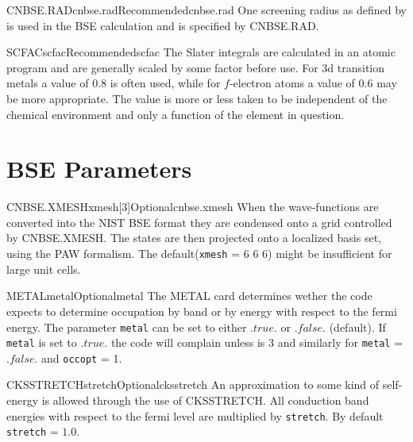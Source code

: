 \documentclass[11pt]{report}
\begin{document}
\begin{Card}{CNBSE.RAD}{cnbse.rad}{Recommended}{cnbse.rad}
One screening radius as defined by  is used in the BSE calculation and is specified by CNBSE.RAD. 
\end{Card}

\begin{Card}{SCFAC}{scfac}{Recommended}{scfac}
The Slater integrals are calculated in an atomic program and are generally scaled by some factor before use. For 3d transition metals a value of $0.8$ is often used, while for $f$-electron atoms a value of $0.6$ may be more appropriate. The value is more or less taken to be independent of the chemical environment and only a function of the element in question.
\end{Card}


\section{BSE Parameters}
\label{sec:BSE-Parameters}

\begin{Card}{CNBSE.XMESH}{xmesh[3]}{Optional}{cnbse.xmesh}
When the wave-functions are converted into the NIST BSE format they are condensed onto a grid controlled by CNBSE.XMESH. The states are then projected onto a localized basis set, using the PAW formalism. The default(\texttt{xmesh} = 6 6 6) might be insufficient for large unit cells.
\end{Card}

\begin{Card}{METAL}{metal}{Optional}{metal}
The METAL card determines wether the code expects to determine occupation by band or by energy with respect to the fermi energy. The parameter \texttt{metal} can be set to either $.true.$ or $.false.$ (default). If \texttt{metal} is set to $.true.$ the code will complain unless  is 3 and similarly for \texttt{metal} = $.false.$ and \texttt{occopt} = 1.
\end{Card}

\begin{Card}{CKSSTRETCH}{stretch}{Optional}{cksstretch}
An approximation to some kind of self-energy is allowed through the use of CKSSTRETCH. All conduction band energies with respect to the fermi level are multiplied by \texttt{stretch}. By default \texttt{stretch} = $1.0$. 
\end{Card}
\end{document}
